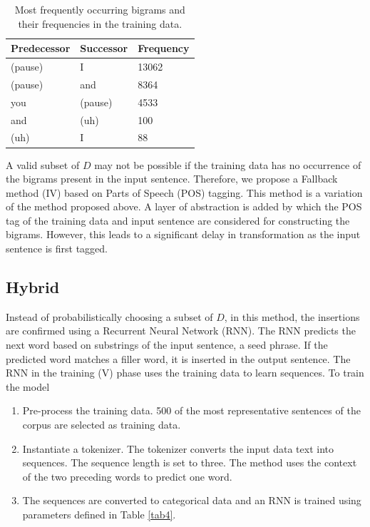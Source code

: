 \documentclass[journal]{IEEEtran}
\begin{document}
\begin{table}
\caption{Most frequently occurring bigrams and their frequencies in the training data.}
\label{tab1}
\small
\setlength{\tabcolsep}{3pt}
\begin{tabular}{|p{80pt}|p{80pt}|p{80pt}|}
\hline
Predecessor& 
Successor& 
Frequency \\
\hline
(pause) & I & 13062\\
(pause) & and & 8364\\
you & (pause) & 4533\\
and & (uh) & 100\\
(uh) & I & 88\\
\hline
\end{tabular}
\label{tab1}
\end{table}

A valid subset of $D$ may not be possible if the training data has no occurrence of the bigrams present in the input sentence. Therefore, we propose a Fallback method (IV) based on Parts of Speech (POS) tagging\cite{pos}. This method is a variation of the method proposed above. A layer of abstraction is added by which the POS tag of the training data and input sentence are considered for constructing the bigrams. However, this leads to a significant delay in transformation as the input sentence is first tagged.

\subsection{Hybrid}

Instead of probabilistically choosing a subset of $D$, in this method, the insertions are confirmed using a Recurrent Neural Network (RNN). The RNN predicts the next word based on substrings of the input sentence, a seed phrase. If the predicted word matches a filler word, it is inserted in the output sentence. The RNN in the training (V) phase uses the training data to learn sequences. To train the model

\begin{enumerate}
    \item Pre-process the training data. 500 of the most representative sentences of the corpus are selected as training data.
    \item Instantiate a tokenizer. The tokenizer converts the input data text into sequences. The sequence length is set to three. The method uses the context of the two preceding words to predict one word.  
    \item The sequences are converted to categorical data and an RNN is trained using parameters defined in Table \ref{tab4}.
\end{enumerate}
\end{document}
